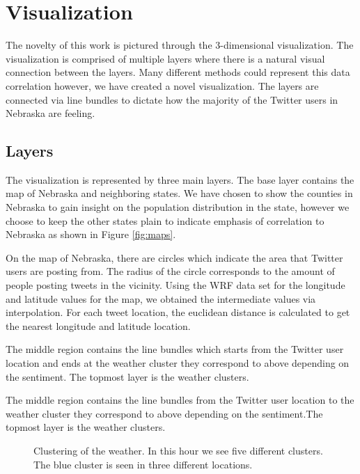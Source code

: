 \section{Visualization}
\label{sec:vis}

The novelty of this work is pictured through the 3-dimensional visualization. The visualization is comprised of multiple layers where there is a natural visual connection between the layers. Many different methods could represent this data correlation however, we have created a novel visualization. The layers are connected via line bundles to dictate how the majority of the Twitter users in Nebraska are feeling.

\subsection{Layers}
The visualization is represented by three main layers. The base layer contains the map of Nebraska and neighboring states. We have chosen to show the counties in Nebraska to gain insight on the population distribution in the state, however we choose to keep the other states plain to indicate emphasis of correlation to Nebraska as shown in Figure \ref{fig:maps}.

On the map of Nebraska, there are circles which indicate the area that Twitter users are posting from. The radius of the circle corresponds to the amount of people posting tweets in the vicinity. Using the WRF data set for the longitude and latitude values for the map, we obtained the intermediate values via interpolation. For each tweet location, the euclidean distance is calculated to get the nearest longitude and latitude location.

The middle region contains the line bundles which starts from the Twitter user location and ends at the weather cluster they correspond to above depending on the sentiment. The topmost layer is the weather clusters.

The middle region contains the line bundles from the Twitter user location to the weather cluster they correspond to above depending on the sentiment.The topmost layer is the weather clusters.

\begin{figure}[htp]
  \centering
  \quad
\caption{Clustering of the weather. In this hour we see five different clusters. The blue cluster is seen in three different locations.}
\label{fig:blur}
\end{figure}

